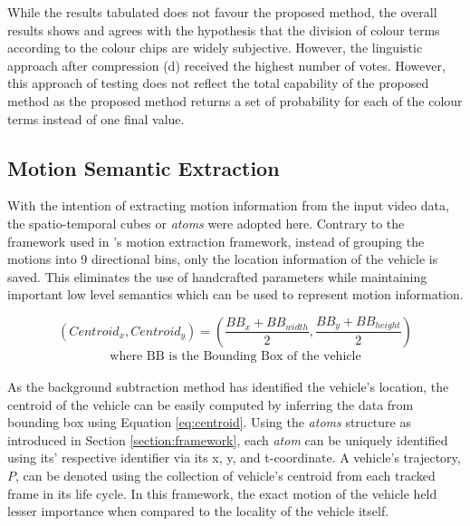 \vspace{-2em}

While the results tabulated does not favour the proposed method, the overall results shows and agrees with the hypothesis that the division of colour terms according to the colour chips are widely subjective. However, the linguistic approach after compression (d) received the highest number of votes.
However, this approach of testing does not reflect the total capability of the proposed method as the proposed method returns a set of probability for each of the colour terms instead of one final value.



\subsection{Motion Semantic Extraction}
\label{subsec:chamferdistancemotionextraction}

With the intention of extracting motion information from the input video data, the spatio-temporal cubes or \emph{atoms} were adopted here. Contrary to the framework used in \versionOneExt's motion extraction framework, instead of grouping the motions into 9 directional bins, only the location information of the vehicle is saved. This eliminates the use of handcrafted parameters while maintaining important low level semantics which can be used to represent motion information. 


\begin{equation}
\label{eq:centroid}
(Centroid_x, Centroid_y) = (\frac{BB_{x}+BB_{width}}{2} , \frac{BB_{y}+BB_{height}}{2})
\end{equation}
\vspace{-2em}
\begin{align*}
    \text{where BB is the Bounding Box of the vehicle}
\end{align*}

As the background subtraction method has identified the vehicle's location, the centroid of the vehicle can be easily computed by inferring the data from bounding box using Equation \ref{eq:centroid}. Using the \emph{atoms} structure as introduced in Section \ref{section:framework}, each \emph{atom} can be uniquely identified using its' respective identifier via its x, y, and t-coordinate. A vehicle's trajectory, $P$, can be denoted using the collection of  vehicle's centroid from each tracked frame in its life cycle. In this framework, the exact motion of the vehicle held lesser importance when compared to the locality of the vehicle itself. 

